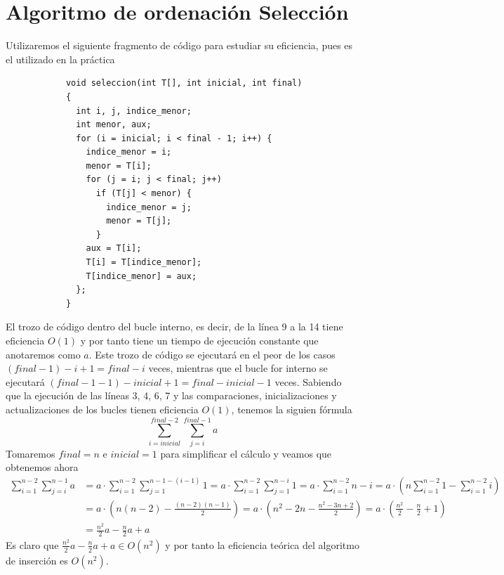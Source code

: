\documentclass[11pt,openany]{book}
\begin{document}
        \section*{Algoritmo de ordenación Selección}
        Utilizaremos el siguiente fragmento de código para estudiar su eficiencia, pues es el utilizado en la práctica
        \begin{lstlisting}
            void seleccion(int T[], int inicial, int final)
            {
              int i, j, indice_menor;
              int menor, aux;
              for (i = inicial; i < final - 1; i++) {
                indice_menor = i;
                menor = T[i];
                for (j = i; j < final; j++)
                  if (T[j] < menor) {
                    indice_menor = j;
                    menor = T[j];
                  }
                aux = T[i];
                T[i] = T[indice_menor];
                T[indice_menor] = aux;
              };
            }
        \end{lstlisting}
        El trozo de código dentro del bucle interno, es decir, de la línea 9 a la 14 tiene eficiencia $O(1)$ y por tanto
        tiene un tiempo de ejecución constante que anotaremos como $a$. Este trozo de código se ejecutará en el peor de los casos
        $(final-1)-i+1=final-i$ veces, mientras que el bucle for interno se ejecutará $(final-1-1)-inicial+1=final -inicial-1$ veces.
        Sabiendo que la ejecución de las líneas 3, 4, 6, 7 y las comparaciones, inicializaciones y actualizaciones de los 
        bucles tienen eficiencia $O(1)$, tenemos la siguien fórmula
        \begin{equation*}
            \sum_{i=inicial}^{final-2} \sum_{j=i}^{final-1}a 
        \end{equation*}
        Tomaremos $final =  n$ e $inicial = 1$ para simplificar el cálculo y veamos que obtenemos ahora
        \begin{equation*}\begin{split}
            \sum_{i=1}^{n-2} \sum_{j=i}^{n-1}a&= a \cdot \sum_{i=1}^{n-2} \sum_{j=1}^{n-1-(i-1)}1
             = a \cdot \sum_{i=1}^{n-2} \sum_{j=1}^{n-i}1=a \cdot \sum_{i=1}^{n-2} n-i= a \cdot (n\sum_{i=1}^{n-2}1 - \sum_{i=1}^{n-2}i) \\
            & = a \cdot\left(n(n-2)-\frac{(n-2)(n-1)}{2}\right)= a \cdot \left(n^2-2n-\frac{n^2-3n+2}{2}\right)= a \cdot \left(\frac{n^2}{2}-\frac{n}{2}+1\right) \\
            & = \frac{n^2}{2}a-\frac{n}{2}a+a
        \end{split}\end{equation*}
        Es claro que $\frac{n^2}{2}a-\frac{n}{2}a+a \in O(n^2)$ y por tanto la eficiencia teórica del algoritmo de inserción es $O(n^2)$.
\end{document}
